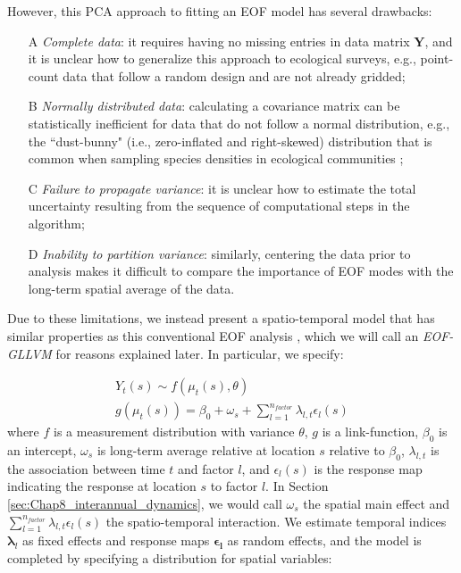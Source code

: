 However, this PCA approach to fitting an EOF model has several drawbacks:
\begin{itemize}
    \item[A] \textit{Complete data}:  it requires having no missing entries in data matrix \(\mathbf{Y}\), and it is unclear how to generalize this approach to ecological surveys, e.g., point-count data that follow a random design and are not already gridded;

    \item[B] \textit{Normally distributed data}: calculating a covariance matrix can be statistically inefficient for data that do not follow a normal distribution, e.g., the ``dust-bunny" (i.e., zero-inflated and right-skewed) distribution that is common when sampling species densities in ecological communities \cite{mccune_origin_2015};

    \item[C] \textit{Failure to propagate variance}:  it is unclear how to estimate the total uncertainty resulting from the sequence of computational steps in the algorithm;

    \item[D] \textit{Inability to partition variance}:  similarly, centering the data prior to analysis makes it difficult to compare the importance of EOF modes with the long-term spatial average of the data.   
\end{itemize}
Due to these limitations, we instead present a spatio-temporal model that has similar properties as this conventional EOF analysis \cite{thorson_defining_2020,wikle_dimension-reduced_1999}, which we will call an \textit{EOF-GLLVM} for reasons explained later.  In particular, we specify:

\begin{equation} \label{eq:Chap9_EOF}
\begin{gathered}
  Y_t(s) \sim f( \mu_t(s), \theta ) \\
  g(\mu_t(s)) = \beta_0 + \omega_s + \sum_{l=1}^{n_{factor}} \lambda_{l,t} \epsilon_l(s)
\end{gathered}    
\end{equation}
where \(f\) is a measurement distribution with variance \(\theta\), \(g\) is a link-function, \( \beta_0 \) is an intercept, \( \omega_s \) is long-term average relative at location \(s\) relative to \(\beta_0\), \( \lambda_{l,t} \) is the association between time \(t\) and factor \(l\), and \(\epsilon_l(s)\) is the response map indicating the response at location \(s\) to factor \(l\).  In Section \ref{sec:Chap8_interannual_dynamics}, we would call \(\omega_s\) the spatial main effect and \(\sum_{l=1}^{n_{factor}} \lambda_{l,t} \epsilon_l(s)\) the spatio-temporal interaction.  We estimate temporal indices \( \mathbf{\lambda}_{l} \) as fixed effects and response maps \( \mathbf{\epsilon_l} \) as random effects, and the model is completed by specifying a distribution for spatial variables:

